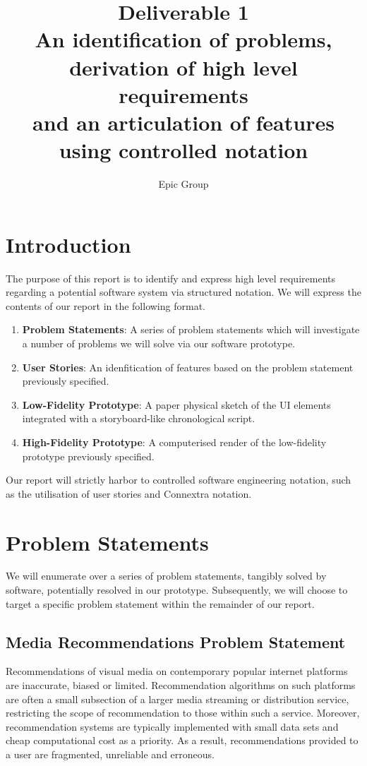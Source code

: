\documentclass{article}
\begin{document}
\title{%
 Deliverable 1\\
 \large An identification of problems, derivation of high level requirements\\
 \large and an articulation of features using controlled notation
}
\author{Epic Group}
\date{}
\maketitle

\section*{Introduction}
The purpose of this report is to identify and express high level requirements
regarding a potential software system via structured notation. We will express
the contents of our report in the following format.
\begin{enumerate}
\item \textbf{Problem Statements}: A series of problem statements which will
investigate a number of problems we will solve via our software prototype.
\item \textbf{User Stories}: An idenfitication of features based on the problem
statement previously specified.
\item \textbf{Low-Fidelity Prototype}: A paper physical sketch of the UI 
elements integrated with a storyboard-like chronological script.
\item \textbf{High-Fidelity Prototype}: A computerised render of the
low-fidelity prototype previously specified.
\end{enumerate}
Our report will strictly harbor to controlled software engineering notation, 
such as the utilisation of user stories and Connextra notation.
\section{Problem Statements}
We will enumerate over a series of problem statements, tangibly solved by
software, potentially resolved in our prototype. Subsequently, we will choose
to target a specific problem statement within the remainder of our report.
\subsection{Media Recommendations Problem Statement}
Recommendations of visual media on contemporary popular internet platforms are
inaccurate, biased or limited. Recommendation algorithms on such platforms are
often a small subsection of a larger media streaming or distribution service, 
restricting the scope of recommendation to those within such a service. Moreover, 
recommendation systems are typically implemented with small data sets and cheap 
computational cost as a priority. As a result, recommendations provided to a 
user are fragmented, unreliable and erroneous.
\end{document}
